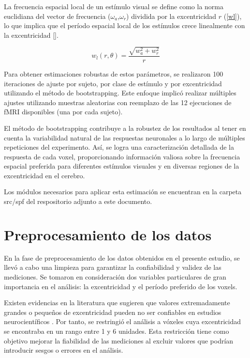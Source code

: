 La frecuencia espacial local de un est\'imulo visual se define como la norma euclidiana del vector de frecuencia ($\omega_a$,$\omega_r$) dividida por la excentricidad  $r$ (\ref{wl}), lo que implica que el período espacial local de los estímulos crece linealmente con la excentricidad [\cite{broderick_mapping_2022}].

\begin{equation}
	w_l(r,\theta) = \dfrac{\sqrt{w_a^2 + w_r^2}}{r} 
	\label{wl}
\end{equation}

Para obtener estimaciones robustas de estos parámetros, se realizaron 100 iteraciones de ajuste por sujeto, por clase de estímulo y por excentricidad utilizando el método de bootstrapping. Este enfoque implicó realizar múltiples ajustes utilizando muestras aleatorias con reemplazo de las 12 ejecuciones de fMRI disponibles (una por cada sujeto).

El método de bootstrapping contribuye a la robustez de los resultados al tener en cuenta la variabilidad natural de las respuestas neuronales a lo largo de múltiples repeticiones del experimento. Así, se logra una caracterización detallada de la respuesta de cada voxel, proporcionando información valiosa sobre la frecuencia espacial preferida para diferentes estímulos visuales y en diversas regiones de la excentricidad en el cerebro.

Los m\'odulos necesarios para aplicar esta estimaci\'on se encuentran en la carpeta src/spf del respositorio adjunto a este documento.

\section{Preprocesamiento de los datos}

En la fase de preprocesamiento de los datos obtenidos en el presente estudio, se llevó a cabo una limpieza para garantizar la confiabilidad y validez de las mediciones. Se tomaron en consideración dos variables particulares de gran importancia en el análisis: la excentricidad y el período preferido de los voxels.

Existen evidencias en la literatura que sugieren que valores extremadamente grandes o pequeños de excentricidad pueden no ser confiables en estudios neurocientíficos . Por tanto, se restringi\'o el análisis a v\'oxeles cuya excentricidad se encontraba en un rango entre 1 y 6 unidades. Esta restricción tiene como objetivo mejorar la fiabilidad de las mediciones al excluir valores que podrían introducir sesgos o errores en el análisis.


